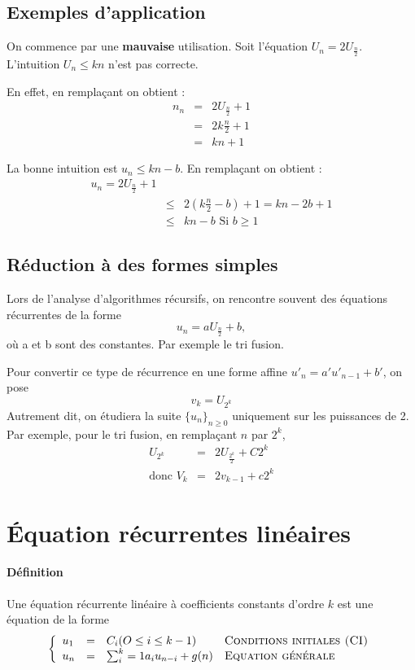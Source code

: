 	\subsection{Exemples d'application}
	On commence par une \textbf{mauvaise} utilisation. Soit l'équation $U_n = 2 U_{\frac{n}{2}}$. L'intuition $U_n \leq kn$ n'est pas correcte.

	En effet, en remplaçant on obtient : 
	\begin{eqnarray*}
		n_n &=& 2U_{\frac{n}{2}}+1\\
		&=& 2k \frac{n}{2} + 1\\
		&=& kn + 1
	\end{eqnarray*}
	
	La bonne intuition est $u_n \leq kn - b$. En remplaçant on obtient : 
	\begin{eqnarray*}
		u_n = 2U_{\frac{n}{2}} + 1\\
		&\leq& 2(k\frac{n}{2} - b) + 1= kn - 2b + 1\\
		&\leq& kn -b\textrm{ Si } b \geq 1
	\end{eqnarray*}

	\subsection{Réduction à des formes simples}
	Lors de l'analyse d'algorithmes récursifs, on rencontre souvent des équations récurrentes de la forme $$u_n = aU_{\frac{n}{2}}+b,$$ où a et b sont des
	constantes. Par exemple le tri fusion.

	Pour convertir ce type de récurrence en une forme affine $u'_n = a'u'_{n-1}+b'$, on pose
	$$v_k = U_{2^k}$$
	Autrement dit, on étudiera la suite $\{u_n\}_{n \geq 0}$ uniquement sur les puissances de 2.
	\\
	Par exemple, pour le tri fusion, en remplaçant $n$ par $2^k$, 
	\begin{eqnarray*}
		U_{2^k} &=& 2U_{\frac{2^k}{2}} + C2^k\\
		\textrm{donc }V_k &=& 2v_{k-1} + c2^k
	\end{eqnarray*}

	\section{Équation récurrentes linéaires}
	\paragraph{Définition} Une équation récurrente linéaire à coefficients constants d'ordre $k$ est une équation de la forme 
	\begin{displaymath}
		\left\{ \begin{array}{llll}
			u_1 &=& C_i (O \leq i \leq k-1) & \textsc{Conditions initiales (CI)}\\
			u_n &=&  \sum^k_i=1 a_i u_{n-i} + g(n) & \textsc{Equation générale}
		\end{array} \right.
	\end{displaymath}

